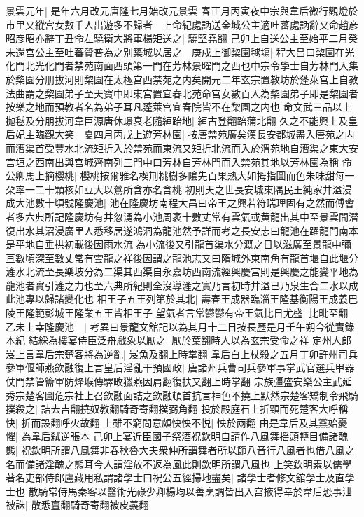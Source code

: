 景雲元年|{
	是年六月改元唐隆七月始改元景雲}
春正月丙寅夜中宗與韋后微行觀燈於市里又縱宫女數千人出遊多不歸者　上命紀處訥送金城公主適吐蕃處訥辭又命趙彦昭彦昭亦辭丁丑命左驍衛大將軍楊矩送之|{
	驍堅堯翻}
己卯上自送公主至始平二月癸未還宫公主至吐蕃贊普為之别築城以居之　庚戍上御棃園毬塲|{
	程大昌曰棃園在光化門北光化門者禁苑南面西頭第一門在芳林景曜門之西也中宗令學士自芳林門入集於棃園分朋拔河則棃園在太極宫西禁苑之内矣開元二年玄宗置教坊於蓬萊宫上自教法曲謂之棃園弟子至天寶中即東宫置宜春北苑命宫女數百人為棃園弟子即是棃園者按樂之地而預教者名為弟子耳凡蓬萊宫宜春院皆不在棃園之内也}
命文武三品以上抛毬及分朋拔河韋巨源唐休璟衰老隨絙踣地|{
	絙古登翻踣蒲北翻}
久之不能興上及皇后妃主臨觀大笑　夏四月丙戌上遊芳林園|{
	按唐禁苑廣矣漢長安都城盡入唐苑之内而漕渠首受豐水北流矩折入於禁苑而東流又矩折北流而入於渭苑地自漕渠之東大安宫垣之西南出與宫城齊南列三門中曰芳林自芳林門而入禁苑其地以芳林園為稱}
命公卿馬上摘櫻桃|{
	櫻桃按爾雅名楔荆桃樹多隂先百果熟大如拇指圓而色朱味甜每一朶率一二十顆核如豆大以鶯所含亦名含桃}
初則天之世長安城東隅民王純家井溢浸成大池數十頃號隆慶池|{
	池在隆慶坊南程大昌曰帝王之興若符瑞理固有之然而傅會者多六典所記隆慶坊有井忽湧為小池周袤十數丈常有雲氣或黄龍出其中至景雲間潜復出水其沼浸廣里人悉移居遂鴻洞為龍池然予詳而考之長安志曰龍池在躍龍門南本是平地自垂拱初載後因雨水流為小流後又引龍首渠水分溉之日以滋廣至景龍中彌亘數頃深至數丈常有雲龍之祥後因謂之龍池志又曰隋城外東南角有龍首堰自此堰分滻水北流至長樂坡分為二渠其西渠自永嘉坊西南流經興慶宫則是興慶之能變平地為龍池者實引滻之力也至六典所紀則全沒導滻之實乃言初時井溢已乃泉生合二水以成此池專以歸諸變化也}
相王子五王列第於其北|{
	壽春王成器臨淄王隆基衡陽王成義巴陵王隆範彭城王隆業五王皆相王子}
望氣者言常鬰鬰有帝王氣比日尤盛|{
	比毗至翻}
乙未上幸隆慶池　|{
	考異曰景龍文舘記以為其月十二日按長歷是月壬午朔今從實錄本紀}
結綵為樓宴侍臣泛舟戲象以厭之|{
	厭於葉翻時人以為玄宗受命之祥}
定州人郎岌上言韋后宗楚客將為逆亂|{
	岌魚及翻上時掌翻}
韋后白上杖殺之五月丁卯許州司兵參軍偃師燕欽融復上言皇后淫亂干預國政|{
	唐諸州兵曹司兵參軍事掌武官選兵甲器仗門禁管籥軍防烽堠傳驛畋獵燕因肩翻復扶又翻上時掌翻}
宗族彊盛安樂公主武延秀宗楚客圖危宗社上召欽融面詰之欽融頓首抗言神色不撓上默然宗楚客矯制令飛騎撲殺之|{
	詰去吉翻撓奴教翻騎奇寄翻撲弼角翻}
投於殿庭石上折頸而死楚客大呼稱快|{
	折而設翻呼火故翻}
上雖不窮問意頗怏怏不悦|{
	怏於兩翻}
由是韋后及其黨始憂懼|{
	為韋后弑逆張本}
己卯上宴近臣國子祭酒祝欽明自請作八風舞揺頭轉目備諸醜態|{
	祝欽明所謂八風舞非春秋魯大夫衆仲所謂舞者所以節八音行八風者也借八風之名而備諸淫醜之態耳今人謂淫放不返為風此則欽明所謂八風也}
上笑欽明素以儒學著名吏部侍郎盧藏用私謂諸學士曰祝公五經掃地盡矣|{
	諸學士者修文舘學士及直學士也}
散騎常侍馬秦客以醫術光祿少卿楊均以善烹調皆出入宫掖得幸於韋后恐事泄被誅|{
	散悉亶翻騎奇寄翻被皮義翻}
